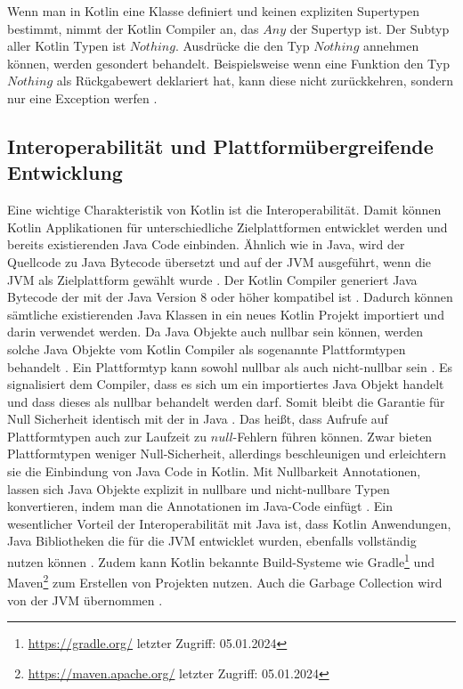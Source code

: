 \documentclass{article}
\begin{document}
Wenn man in Kotlin eine Klasse definiert und keinen expliziten Supertypen bestimmt, nimmt der Kotlin Compiler an, das $Any$ der Supertyp ist. Der Subtyp aller Kotlin Typen ist $Nothing$. Ausdrücke die den Typ $Nothing$ annehmen können, werden gesondert behandelt. Beispielsweise wenn eine Funktion den Typ $Nothing$ als Rückgabewert deklariert hat, kann diese nicht zurückkehren, sondern nur eine Exception werfen \cite{KotlinLangSpec}.
\subsection{Interoperabilität und Plattformübergreifende Entwicklung}
Eine wichtige Charakteristik von Kotlin ist die Interoperabilität. Damit können Kotlin Applikationen für unterschiedliche Zielplattformen entwicklet werden und bereits existierenden Java Code einbinden. Ähnlich wie in Java, wird der Quellcode zu Java Bytecode übersetzt und auf der JVM ausgeführt, wenn die JVM als Zielplattform gewählt wurde \cite{KotlinLangDoc}. Der Kotlin Compiler generiert Java Bytecode der mit der Java Version 8 oder höher kompatibel ist \cite{KotlinLangDocFAQ}. Dadurch können sämtliche existierenden Java Klassen in ein neues Kotlin Projekt importiert und darin verwendet werden. Da Java Objekte auch nullbar sein können, werden solche Java Objekte vom Kotlin Compiler als sogenannte Plattformtypen behandelt \cite{Kotlin_In-D}. Ein Plattformtyp kann sowohl nullbar als auch nicht-nullbar sein \cite{Kotlin_In-D}. Es signalisiert dem Compiler, dass es sich um ein importiertes Java Objekt handelt und dass dieses als nullbar behandelt werden darf. Somit bleibt die Garantie für Null Sicherheit identisch mit der in Java \cite{Kotlin_In-D}. Das heißt, dass Aufrufe auf Plattformtypen auch zur Laufzeit zu $null$-Fehlern führen können. Zwar bieten Plattformtypen weniger Null-Sicherheit, allerdings beschleunigen und erleichtern sie die Einbindung von Java Code in Kotlin. Mit Nullbarkeit Annotationen, lassen sich Java Objekte explizit in nullbare und nicht-nullbare Typen konvertieren, indem man die Annotationen im Java-Code einfügt \cite{Kotlin_In-D}. \newline
Ein wesentlicher Vorteil der Interoperabilität mit Java ist, dass Kotlin Anwendungen, Java Bibliotheken die für die JVM entwicklet wurden, ebenfalls vollständig nutzen können \cite{KotlinLangDoc}. Zudem kann Kotlin bekannte Build-Systeme wie Gradle\footnote{\url{https://gradle.org/} letzter Zugriff: 05.01.2024} und Maven\footnote{\url{https://maven.apache.org/} letzter Zugriff: 05.01.2024} zum Erstellen von Projekten nutzen. Auch die Garbage Collection wird von der JVM übernommen \cite{KotlinLangDoc}. \newline
\end{document}

